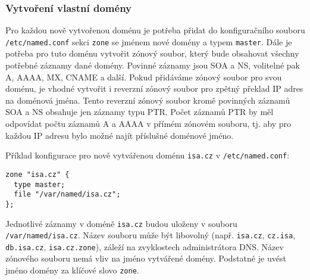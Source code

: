 
\subsubsection{Vytvoření vlastní domény}\label{sec:vlastni_zona}
Pro každou nově vytvořenou doménu je potřeba přidat do konfiguračního souboru {\tt /etc/named.conf} sekci {\tt zone} se jménem nové domény a typem {\tt master}. Dále je potřeba pro tuto doménu vytvořit zónový soubor, který bude obsahovat všechny potřebné záznamy dané domény. Povinné záznamy jsou SOA a NS, volitelné pak A, AAAA, MX, CNAME a další. Pokud přidáváme  zónový soubor pro svou doménu, je vhodné vytvořit i reverzní zónový soubor pro zpětný překlad IP adres na doménová jména. Tento reverzní zónový soubor kromě povinných záznamů SOA a NS obsahuje jen záznamy typu PTR. Počet záznamů PTR by měl odpovídat počtu záznamů A a AAAA v přímém zónovém souboru, tj. aby pro každou IP adresu bylo možné najít příslušné doménové jméno. 

Příklad konfigurace pro nově vytvářenou doménu {\tt isa.cz} v {\tt /etc/named.conf}:
\begin{verbatim}
zone "isa.cz" {
  type master;
  file "/var/named/isa.cz";
};
\end{verbatim}

Jednotlivé záznamy v doméně {\tt isa.cz} budou uloženy v souboru {\tt /var/named/isa.cz}. Název souboru může být libovolný (např. {\tt isa.cz}, {\tt cz.isa}, {\tt db.isa.cz}, {\tt isa.cz.zone}), záleží na zvyklostech administrátora DNS. Název zónového souboru nemá vliv na jméno vytvářené domény. Podstatné je uvést jméno domény za klíčové slovo {\tt zone}. 

